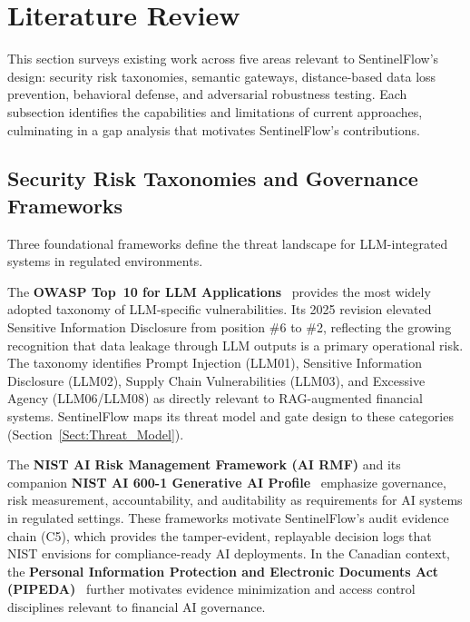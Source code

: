 \documentclass[journal]{IEEEtran}
\begin{document}
\section{Literature Review}
\label{Sect:Literature_Review}
%

This section surveys existing work across five areas relevant to SentinelFlow's design: security risk taxonomies, semantic gateways, distance-based data loss prevention, behavioral defense, and adversarial robustness testing. Each subsection identifies the capabilities and limitations of current approaches, culminating in a gap analysis that motivates SentinelFlow's contributions.

\subsection{Security Risk Taxonomies and Governance Frameworks}
\label{Sect:LR_Taxonomies}

Three foundational frameworks define the threat landscape for LLM-integrated systems in regulated environments.

The \textbf{OWASP Top~10 for LLM Applications}~\cite{owasp_llm_2025} provides the most widely adopted taxonomy of LLM-specific vulnerabilities. Its 2025 revision elevated Sensitive Information Disclosure from position \#6 to \#2, reflecting the growing recognition that data leakage through LLM outputs is a primary operational risk. The taxonomy identifies Prompt Injection (LLM01), Sensitive Information Disclosure (LLM02), Supply Chain Vulnerabilities (LLM03), and Excessive Agency (LLM06/LLM08) as directly relevant to RAG-augmented financial systems. SentinelFlow maps its threat model and gate design to these categories (Section~\ref{Sect:Threat_Model}).

The \textbf{NIST AI Risk Management Framework (AI RMF)} and its companion \textbf{NIST AI 600-1 Generative AI Profile}~\cite{nist_ai_rmf, nist_ai_600_1} emphasize governance, risk measurement, accountability, and auditability as requirements for AI systems in regulated settings. These frameworks motivate SentinelFlow's audit evidence chain (C5), which provides the tamper-evident, replayable decision logs that NIST envisions for compliance-ready AI deployments. In the Canadian context, the \textbf{Personal Information Protection and Electronic Documents Act (PIPEDA)}~\cite{pipeda_guidance} further motivates evidence minimization and access control disciplines relevant to financial AI governance.
\end{document}
